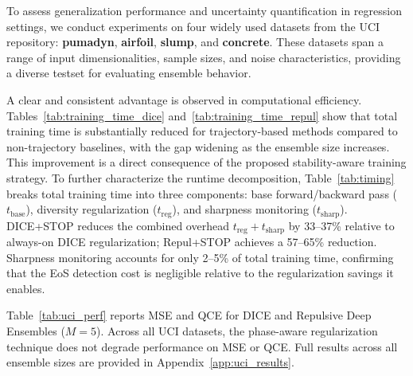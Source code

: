\documentclass[sigconf]{acmart}
\begin{document}
To assess generalization performance and uncertainty quantification in regression settings, we conduct experiments on four widely used datasets from the UCI repository: \textbf{pumadyn}, \textbf{airfoil}, \textbf{slump}, and \textbf{concrete}. These datasets span a range of input dimensionalities, sample sizes, and noise characteristics, providing a diverse testset for evaluating ensemble behavior.

A clear and consistent advantage is observed in computational efficiency. Tables~\ref{tab:training_time_dice} and~\ref{tab:training_time_repul} show that total training time is substantially reduced for trajectory-based methods compared to non-trajectory baselines, with the gap widening as the ensemble size increases. This improvement is a direct consequence of the proposed stability-aware training strategy.
To further characterize the runtime decomposition, Table~\ref{tab:timing} breaks total training time into three components: base forward/backward pass ($t_{\text{base}}$), diversity regularization ($t_{\text{reg}}$), and sharpness monitoring ($t_{\text{sharp}}$).
DICE+STOP reduces the combined overhead $t_{\text{reg}}+t_{\text{sharp}}$ by 33--37\% relative to always-on DICE regularization; Repul+STOP achieves a 57--65\% reduction.
Sharpness monitoring accounts for only 2--5\% of total training time, confirming that the EoS detection cost is negligible relative to the regularization savings it enables.

Table~\ref{tab:uci_perf} reports MSE and QCE for DICE and Repulsive Deep Ensembles ($M=5$). Across all UCI datasets, the phase-aware regularization technique does not degrade performance on MSE or QCE. Full results across all ensemble sizes are provided in Appendix~\ref{app:uci_results}.
\end{document}
